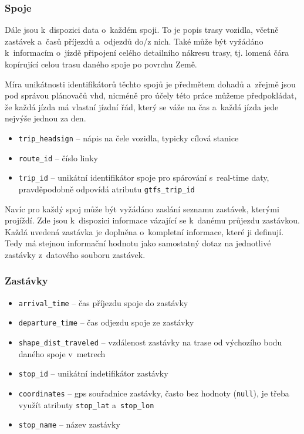 \subsubsection{Spoje}

Dále jsou k~dispozici data o~každém spoji. To je popis trasy vozidla, včetně zastávek a~časů příjezdů a~odjezdů do/z nich. Také může být vyžádáno k~informacím o~jízdě připojení celého detailního nákresu trasy, tj. lomená čára kopírující celou trasu daného spoje po povrchu Země.

\bigbreak

Míra unikátnosti identifikátorů těchto spojů je předmětem dohadů a~zřejmě jsou pod správou plánovačů \gls{vhd}, nicméně pro účely této práce můžeme předpokládat, že každá jízda má vlastní jízdní řád, který se váže na čas a~každá jízda jede nejvýše jednou za den.

\begin{itemize}
	\item \verb-trip_headsign- -- nápis na čele vozidla, typicky cílová stanice

	\item \verb-route_id- -- číslo linky

	\item \verb-trip_id- -- unikátní identifikátor spoje pro spárování s~real-time daty, pravděpodobně odpovídá atributu \verb"gtfs_trip_id"


\end{itemize}

Navíc pro každý spoj může být vyžádáno zaslání seznamu zastávek, kterými projíždí. Zde jsou k~dispozici informace vázající se k~danému průjezdu zastávkou. Každá uvedená zastávka je doplněna o~kompletní informace, které ji definují. Tedy má stejnou informační hodnotu jako samostatný dotaz na jednotlivé zastávky z~datového souboru zastávek.

\subsubsection{Zastávky}

\begin{itemize}
	\item \verb-arrival_time- -- čas příjezdu spoje do zastávky

	\item \verb-departure_time- -- čas odjezdu spoje ze zastávky

	\item \verb-shape_dist_traveled- -- vzdálenost zastávky na trase od výchozího bodu daného spoje v~metrech

	\item \verb-stop_id- -- unikátní indetifikátor zastávky

	\item \verb-coordinates- -- \gls{gps} souřadnice zastávky, často bez hodnoty (\verb"null"), je třeba využít atributy \verb"stop_lat" a~\verb"stop_lon"

	\item \verb-stop_name- -- název zastávky
\end{itemize}

